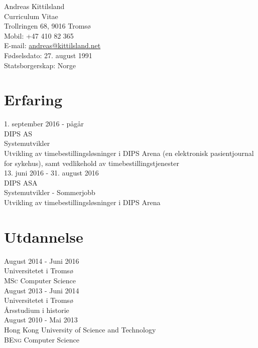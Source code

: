\documentclass[10pt, a4paper]{article}
\newcommand{\interval}[2]{\small{#1 - #2}}
\newcommand{\institution}[1]{\normalsize{#1}}
\newcommand{\position}[1]{\large{#1}}
\newcommand{\course}[2]{\position{\textsc{#1} #2}}
\newcommand{\desc}[1]{\normalsize{#1}}
\begin{document}
{\LARGE Andreas Kittilsland}\\
{\large Curriculum Vitae}\\[14pt]
Trollringen 68, 9016 Tromsø\\
Mobil: +47 410 82 365\\
E-mail: \href{mailto:andreas@kittilsland.net}{andreas@kittilsland.net}\\
Fødselsdato: 27. august 1991\\
Statsborgerskap: Norge

\section*{Erfaring}

\interval{1. september 2016}{pågår}\\
\institution{DIPS AS}\\
\position{Systemutvikler}\\
\desc{Utvikling av timebestillingsløsninger i DIPS Arena (en elektronisk pasientjournal for sykehus), samt vedlikehold av timebestillingstjenester}\\

\interval{13. juni 2016}{31. august 2016}\\
\institution{DIPS ASA}\\
\position{Systemutvikler - Sommerjobb}\\
\desc{Utvikling av timebestillingsløsninger i DIPS Arena}\\

\section*{Utdannelse}

\interval{August 2014}{Juni 2016}\\
\institution{Universitetet i Tromsø}\\
\course{MSc}{Computer Science}\\

\interval{August 2013}{Juni 2014}\\
\institution{Universitetet i Tromsø}\\
\course{}{Årsstudium i historie}\\

\interval{August 2010}{Mai 2013}\\
\institution{Hong Kong University of Science and Technology}\\
\course{BEng}{Computer Science}\\
\end{document}
